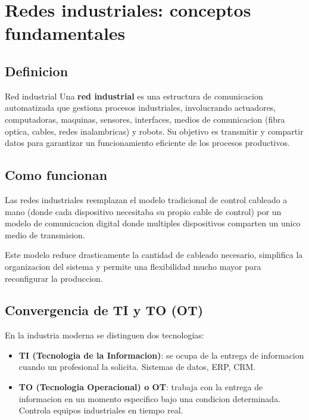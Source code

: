 \section{Redes industriales: conceptos fundamentales}

\subsection{Definicion}

\begin{definicion}{Red industrial}
Una \textbf{red industrial} es una estructura de comunicacion automatizada que
gestiona procesos industriales, involucrando actuadores, computadoras, maquinas,
sensores, interfaces, medios de comunicacion (fibra optica, cables, redes
inalambricas) y robots. Su objetivo es transmitir y compartir datos para garantizar
un funcionamiento eficiente de los procesos productivos.
\end{definicion}

\subsection{Como funcionan}

Las redes industriales reemplazan el modelo tradicional de control cableado a
mano (donde cada dispositivo necesitaba su propio cable de control) por un modelo
de comunicacion digital donde multiples dispositivos comparten un unico medio de
transmision.

Este modelo reduce drasticamente la cantidad de cableado necesario, simplifica
la organizacion del sistema y permite una flexibilidad mucho mayor para
reconfigurar la produccion.

\subsection{Convergencia de TI y TO (OT)}

En la industria moderna se distinguen dos tecnologias:

\begin{itemize}
    \item \textbf{TI (Tecnologia de la Informacion)}: se ocupa de la entrega de
    informacion cuando un profesional la solicita. Sistemas de datos, ERP, CRM.
    \item \textbf{TO (Tecnologia Operacional) o OT}: trabaja con la entrega de
    informacion en un momento especifico bajo una condicion determinada.
    Controla equipos industriales en tiempo real.
\end{itemize}

